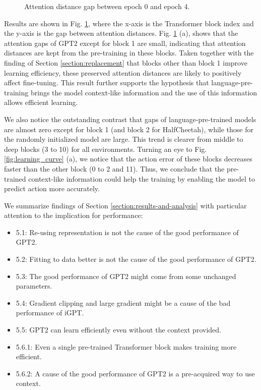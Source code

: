 \begin{figure}[h]
\begin{minipage}[b]{0.32\linewidth}
    \end{minipage}
    \caption{Attention distance gap between epoch 0 and epoch 4.}
    \label{fig:attention_distance_before_after_epoch_4}
\end{figure}

Results are shown in Fig. \ref{fig:attention_distance_before_after_epoch_4}, where the x-axis is the Transformer block index and the y-axis is the gap between attention distances. Fig. \ref{fig:attention_distance_before_after_epoch_4} (a), shows that the attention gaps of GPT2 except for block 1 are small, indicating that attention distances are kept from the pre-training in these blocks. Taken together with the finding of Section \ref{section:replacement} that blocks other than block 1 improve learning efficiency, these preserved attention distances are likely to positively affect fine-tuning. This result further supports the hypothesis that language-pre-training brings the model context-like information and the use of this information allows efficient learning.

We also notice the outstanding contrast that gaps of language-pre-trained models are almost zero except for block 1 (and block 2 for HalfCheetah), while those for the randomly initialized model are large. This trend is clearer from middle to deep blocks (3 to 10) for all environments. Turning an eye to Fig. \ref{fig:learning_curve} (a), we notice that the action error of these blocks decreases faster than the other block (0 to 2 and 11). Thus, we conclude that the pre-trained context-like information could help the training by enabling the model to predict action more accurately.

We summarize findings of Section \ref{section:results-and-analysis} with particular attention to the implication for performance:
\begin{itemize}
    \item 5.1: Re-using representation is not the cause of the good performance of GPT2.
    \item 5.2: Fitting to data better is not the cause of the good performance of GPT2.
    \item 5.3: The good performance of GPT2 might come from some unchanged parameters.
    \item 5.4: Gradient clipping and large gradient might be a cause of the bad performance of iGPT.
    \item 5.5: GPT2 can learn efficiently even without the context provided.
    \item 5.6.1: Even a single pre-trained Transformer block makes training more efficient.
    \item 5.6.2: A cause of the good performance of GPT2 is a pre-acquired way to use context.
\end{itemize}
